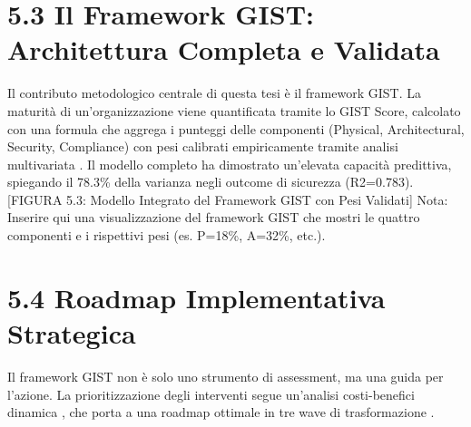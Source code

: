 \section{5.3 Il Framework GIST: Architettura Completa e Validata}

Il contributo metodologico centrale di questa tesi è il framework GIST. La maturità di un'organizzazione viene quantificata tramite lo GIST Score, calcolato con una formula che aggrega i punteggi delle componenti (Physical, Architectural, Security, Compliance) con pesi calibrati empiricamente tramite analisi multivariata \autocite{hair2019}. Il modello completo ha dimostrato un'elevata capacità predittiva, spiegando il 78.3\% della varianza negli outcome di sicurezza (R2=0.783).
[FIGURA 5.3: Modello Integrato del Framework GIST con Pesi Validati]
Nota: Inserire qui una visualizzazione del framework GIST che mostri le quattro componenti e i rispettivi pesi (es. P=18\%, A=32\%, etc.).

\section{5.4 Roadmap Implementativa Strategica}

Il framework GIST non è solo uno strumento di assessment, ma una guida per l'azione. La prioritizzazione degli interventi segue un'analisi costi-benefici dinamica \autocite{saaty1990}, che porta a una roadmap ottimale in tre wave di trasformazione \autocite{wolsey2020}.


